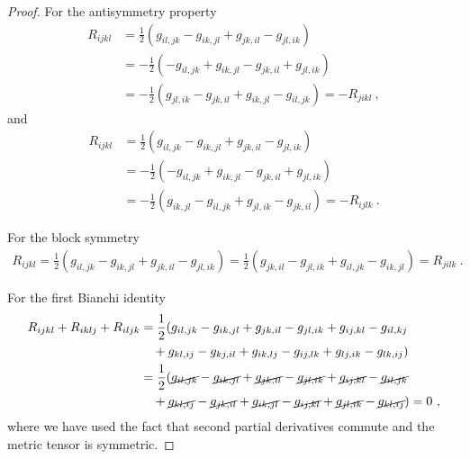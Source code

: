     \begin{proof}
        For the antisymmetry property
        \begin{equation*}
        \begin{aligned}
            R_{ijkl} & = \frac{1}{2} (g_{il,jk} - g_{ik,jl} + g_{jk,il} - g_{jl,ik}) \\ & = - \frac{1}{2} (- g_{il,jk} + g_{ik,jl} - g_{jk,il} + g_{jl,ik}) \\ & = - \frac{1}{2} (g_{jl,ik} - g_{jk,il} + g_{ik,jl} - g_{il,jk}) = - R_{jikl} ~,
        \end{aligned}
        \end{equation*}
        and 
        \begin{equation*}
        \begin{aligned}
            R_{ijkl} & = \frac{1}{2} (g_{il,jk} - g_{ik,jl} + g_{jk,il} - g_{jl,ik}) \\ & = - \frac{1}{2} (- g_{il,jk} + g_{ik,jl} - g_{jk,il} + g_{jl,ik}) \\ & = - \frac{1}{2} ( g_{ik,jl} - g_{il,jk} + g_{jl,ik}  - g_{jk,il}) = - R_{ijlk} ~.
        \end{aligned}
        \end{equation*}

        For the block symmetry
        \begin{equation*}
        \begin{aligned}
            R_{ijkl} = \frac{1}{2} (g_{il,jk} - g_{ik,jl} + g_{jk,il} - g_{jl,ik}) = \frac{1}{2} (g_{jk,il} - g_{jl,ik} +  g_{il,jk} - g_{ik,jl}) = R_{jilk} ~.
        \end{aligned}
        \end{equation*}

        For the first Bianchi identity 
        \begin{equation*}
        \begin{aligned}
            R_{ijkl} + R_{iklj} + R_{iljk} & = \frac{1}{2} (g_{il,jk} - g_{ik,jl} + g_{jk,il} - g_{jl,ik} + g_{ij,kl} - g_{il,kj} \\ & \quad + g_{kl,ij} - g_{kj,il} + g_{ik,lj} - g_{ij,lk} + g_{lj,ik} - g_{lk,ij} ) \\ & = \frac{1}{2} (\cancel{g_{il,jk}} - \cancel{g_{ik,jl}} + \cancel{g_{jk,il}} - \cancel{g_{jl,ik}} + \cancel{g_{ij,kl}} - \cancel{g_{il,jk}} \\ & \quad + \cancel{g_{kl,ij}} - \cancel{g_{jk,il} } + \cancel{g_{ik,jl}} - \cancel{g_{ij,kl}} + \cancel{g_{jl,ik}} - \cancel{g_{kl,ij}}) = 0 ~,
        \end{aligned}
        \end{equation*}
        where we have used the fact that second partial derivatives commute and the metric tensor is symmetric.


\end{proof}
